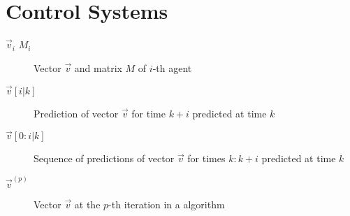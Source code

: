 \documentclass[../main.tex]{subfiles}
\begin{document}
\begin{description}
\end{description}

\section*{Control Systems}

\begin{description}

  \item[$\vec{v}_{i}$ $M_{i}$] Vector $\vec{v}$ and matrix $M$ of $i$-th agent
  \item[${\vec{v}[i|k]}$] Prediction of vector $\vec{v}$ for time ${k+i}$ predicted at time $k$
  \item[${\vec{v}[0:i|k]}$] Sequence of predictions of vector $\vec{v}$ for times $k:k+i$ predicted at time $k$
  \item[$\vec{v}^{(p)}$ ] Vector $\vec{v}$ at the $p$-th iteration in a algorithm
\end{description}
\end{document}
